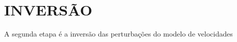 \chapter{INVERSÃO}
\label{cap3}

A segunda etapa é a inversão das perturbações do modelo de velocidades




